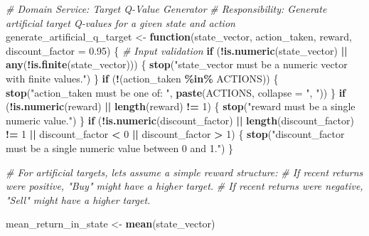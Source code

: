\documentclass[
]{article}
\newenvironment{Shaded}{\begin{snugshade}}{\end{snugshade}}
\newcommand{\AttributeTok}[1]{\textcolor[rgb]{0.13,0.29,0.53}{#1}}
\newcommand{\CommentTok}[1]{\textcolor[rgb]{0.56,0.35,0.01}{\textit{#1}}}
\newcommand{\ControlFlowTok}[1]{\textcolor[rgb]{0.13,0.29,0.53}{\textbf{#1}}}
\newcommand{\DecValTok}[1]{\textcolor[rgb]{0.00,0.00,0.81}{#1}}
\newcommand{\FloatTok}[1]{\textcolor[rgb]{0.00,0.00,0.81}{#1}}
\newcommand{\FunctionTok}[1]{\textcolor[rgb]{0.13,0.29,0.53}{\textbf{#1}}}
\newcommand{\NormalTok}[1]{#1}
\newcommand{\OtherTok}[1]{\textcolor[rgb]{0.56,0.35,0.01}{#1}}
\newcommand{\SpecialCharTok}[1]{\textcolor[rgb]{0.81,0.36,0.00}{\textbf{#1}}}
\newcommand{\StringTok}[1]{\textcolor[rgb]{0.31,0.60,0.02}{#1}}
\begin{document}
\begin{Shaded}
\begin{Highlighting}[]
\CommentTok{\# Domain Service: Target Q{-}Value Generator}
\CommentTok{\# Responsibility: Generate artificial target Q{-}values for a given state and action}
\NormalTok{generate\_artificial\_q\_target }\OtherTok{\textless{}{-}} \ControlFlowTok{function}\NormalTok{(state\_vector, action\_taken, reward, }\AttributeTok{discount\_factor =} \FloatTok{0.95}\NormalTok{) \{}
  \CommentTok{\# Input validation}
  \ControlFlowTok{if}\NormalTok{ (}\SpecialCharTok{!}\FunctionTok{is.numeric}\NormalTok{(state\_vector) }\SpecialCharTok{||} \FunctionTok{any}\NormalTok{(}\SpecialCharTok{!}\FunctionTok{is.finite}\NormalTok{(state\_vector))) \{}
    \FunctionTok{stop}\NormalTok{(}\StringTok{"state\_vector must be a numeric vector with finite values."}\NormalTok{)}
\NormalTok{  \}}
  \ControlFlowTok{if}\NormalTok{ (}\SpecialCharTok{!}\NormalTok{(action\_taken }\SpecialCharTok{\%in\%}\NormalTok{ ACTIONS)) \{}
    \FunctionTok{stop}\NormalTok{(}\StringTok{"action\_taken must be one of: "}\NormalTok{, }\FunctionTok{paste}\NormalTok{(ACTIONS, }\AttributeTok{collapse =} \StringTok{", "}\NormalTok{))}
\NormalTok{  \}}
  \ControlFlowTok{if}\NormalTok{ (}\SpecialCharTok{!}\FunctionTok{is.numeric}\NormalTok{(reward) }\SpecialCharTok{||} \FunctionTok{length}\NormalTok{(reward) }\SpecialCharTok{!=} \DecValTok{1}\NormalTok{) \{}
    \FunctionTok{stop}\NormalTok{(}\StringTok{"reward must be a single numeric value."}\NormalTok{)}
\NormalTok{  \}}
  \ControlFlowTok{if}\NormalTok{ (}\SpecialCharTok{!}\FunctionTok{is.numeric}\NormalTok{(discount\_factor) }\SpecialCharTok{||} \FunctionTok{length}\NormalTok{(discount\_factor) }\SpecialCharTok{!=} \DecValTok{1} \SpecialCharTok{||}\NormalTok{ discount\_factor }\SpecialCharTok{\textless{}} \DecValTok{0} \SpecialCharTok{||}\NormalTok{ discount\_factor }\SpecialCharTok{\textgreater{}} \DecValTok{1}\NormalTok{) \{}
    \FunctionTok{stop}\NormalTok{(}\StringTok{"discount\_factor must be a single numeric value between 0 and 1."}\NormalTok{)}
\NormalTok{  \}}
  
  \CommentTok{\# For artificial targets, let\textquotesingle{}s assume a simple reward structure:}
  \CommentTok{\# If recent returns were positive, "Buy" might have a higher target.}
  \CommentTok{\# If recent returns were negative, "Sell" might have a higher target.}
  
\NormalTok{  mean\_return\_in\_state }\OtherTok{\textless{}{-}} \FunctionTok{mean}\NormalTok{(state\_vector)}
  

\end{Highlighting}
\end{Shaded}
\end{document}
